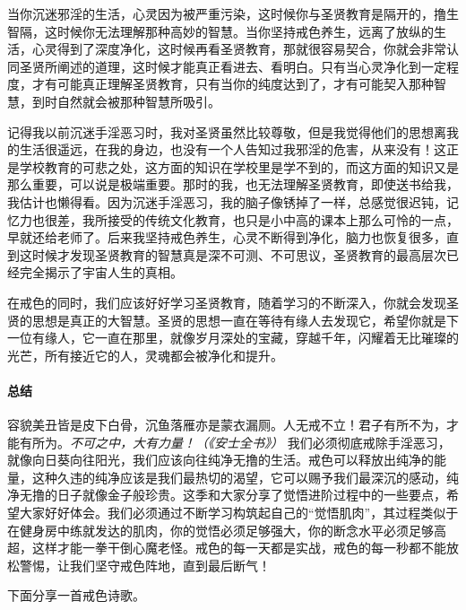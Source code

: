 当你沉迷邪淫的生活，心灵因为被严重污染，这时候你与圣贤教育是隔开的，撸生智隔，这时候你无法理解那种高妙的智慧。当你坚持戒色养生，远离了放纵的生活，心灵得到了深度净化，这时候再看圣贤教育，那就很容易契合，你就会非常认同圣贤所阐述的道理，这时候才能真正看进去、看明白。只有当心灵净化到一定程度，才有可能真正理解圣贤教育，只有当你的纯度达到了，才有可能契入那种智慧，到时自然就会被那种智慧所吸引。

记得我以前沉迷手淫恶习时，我对圣贤虽然比较尊敬，但是我觉得他们的思想离我的生活很遥远，在我的身边，也没有一个人告知过我邪淫的危害，从来没有！这正是学校教育的可悲之处，这方面的知识在学校里是学不到的，而这方面的知识又是那么重要，可以说是极端重要。那时的我，也无法理解圣贤教育，即使送书给我，我估计也懒得看。因为沉迷手淫恶习，我的脑子像锈掉了一样，总感觉很迟钝，记忆力也很差，我所接受的传统文化教育，也只是小中高的课本上那么可怜的一点，早就还给老师了。后来我坚持戒色养生，心灵不断得到净化，脑力也恢复很多，直到这时候才发现圣贤教育的智慧真是深不可测、不可思议，圣贤教育的最高层次已经完全揭示了宇宙人生的真相。

在戒色的同时，我们应该好好学习圣贤教育，随着学习的不断深入，你就会发现圣贤的思想是真正的大智慧。圣贤的思想一直在等待有缘人去发现它，希望你就是下一位有缘人，它一直在那里，就像岁月深处的宝藏，穿越千年，闪耀着无比璀璨的光芒，所有接近它的人，灵魂都会被净化和提升。

\paragraph*{总结}

容貌美丑皆是皮下白骨，沉鱼落雁亦是蒙衣漏厕。人无戒不立！君子有所不为，才能有所为。\textit{不可之中，大有力量！（《安士全书》）} 我们必须彻底戒除手淫恶习，就像向日葵向往阳光，我们应该向往纯净无撸的生活。戒色可以释放出纯净的能量，这种久违的纯净应该是我们最热切的渴望，它可以赐予我们最深沉的感动，纯净无撸的日子就像金子般珍贵。这季和大家分享了觉悟进阶过程中的一些要点，希望大家好好体会。我们必须通过不断学习构筑起自己的“觉悟肌肉”，其过程类似于在健身房中练就发达的肌肉，你的觉悟必须足够强大，你的断念水平必须足够高超，这样才能一拳干倒心魔老怪。戒色的每一天都是实战，戒色的每一秒都不能放松警惕，让我们坚守戒色阵地，直到最后断气！

下面分享一首戒色诗歌。

